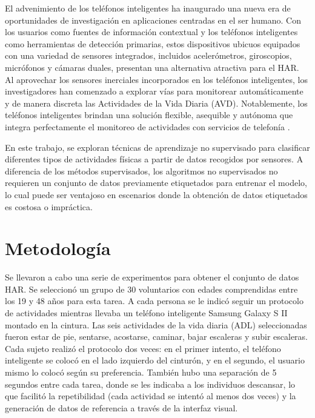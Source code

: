 \documentclass{esannV2}
\begin{document}
El advenimiento de los teléfonos inteligentes ha inaugurado una nueva era de oportunidades de investigación en aplicaciones centradas en el ser humano. Con los usuarios como fuentes de información contextual y los teléfonos inteligentes como herramientas de detección primarias, estos dispositivos ubicuos equipados con una variedad de sensores integrados, incluidos acelerómetros, giroscopios, micrófonos y cámaras duales, presentan una alternativa atractiva para el HAR. Al aprovechar los sensores inerciales incorporados en los teléfonos inteligentes, los investigadores han comenzado a explorar vías para monitorear automáticamente y de manera discreta las Actividades de la Vida Diaria (AVD). Notablemente, los teléfonos inteligentes brindan una solución flexible, asequible y autónoma que integra perfectamente el monitoreo de actividades con servicios de telefonía \cite{esann2013}.

En este trabajo, se exploran técnicas de aprendizaje no supervisado para clasificar diferentes tipos de actividades físicas a partir de datos recogidos por sensores. A diferencia de los métodos supervisados, los algoritmos no supervisados no requieren un conjunto de datos previamente etiquetados para entrenar el modelo, lo cual puede ser ventajoso en escenarios donde la obtención de datos etiquetados es costosa o impráctica.

\section{Metodología}
Se llevaron a cabo una serie de experimentos para obtener el conjunto de datos HAR. Se seleccionó un grupo de 30 voluntarios con edades comprendidas entre los 19 y 48 años para esta tarea. A cada persona se le indicó seguir un protocolo de actividades mientras llevaba un teléfono inteligente Samsung Galaxy S II montado en la cintura. Las seis actividades de la vida diaria (ADL) seleccionadas fueron estar de pie, sentarse, acostarse, caminar, bajar escaleras y subir escaleras. Cada sujeto realizó el protocolo dos veces: en el primer intento, el teléfono inteligente se colocó en el lado izquierdo del cinturón, y en el segundo, el usuario mismo lo colocó según su preferencia. También hubo una separación de 5 segundos entre cada tarea, donde se les indicaba a los individuos descansar, lo que facilitó la repetibilidad (cada actividad se intentó al menos dos veces) y la generación de datos de referencia a través de la interfaz visual.
\end{document}
